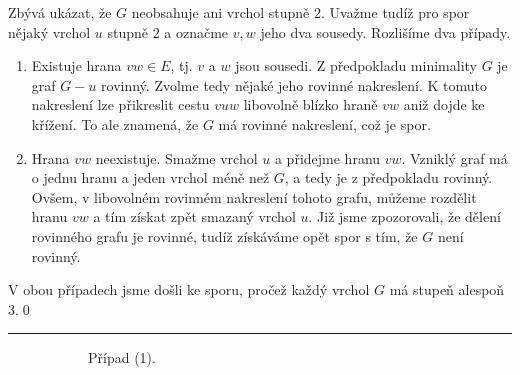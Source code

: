 \begin{enhproof}
 Zbývá ukázat, že $G$ neobsahuje ani vrchol stupně $2$. Uvažme tudíž pro spor
 nějaký vrchol $u$ stupně $2$ a označme $v,w$ jeho dva sousedy. Rozlišíme dva
 případy.
 \begin{enumerate}
  \item Existuje hrana $vw \in E$, tj. $v$ a $w$ jsou sousedi. Z předpokladu
   minimality $G$ je graf $G - u$ rovinný. Zvolme tedy nějaké jeho rovinné
   nakreslení. K tomuto nakreslení lze přikreslit cestu $vuw$ libovolně blízko
   hraně $vw$ aniž dojde ke křížení. To ale znamená, že $G$ má rovinné
   nakreslení, což je spor.
  \item Hrana $vw$ neexistuje. Smažme vrchol $u$ a přidejme hranu $vw$. Vzniklý
   graf má o jednu hranu a jeden vrchol méně než $G$, a tedy je z předpokladu
   rovinný. Ovšem, v libovolném rovinném nakreslení tohoto grafu, můžeme
   rozdělit hranu $vw$ a tím získat zpět smazaný vrchol $u$. Již jsme
   zpozorovali, že dělení rovinného grafu je rovinné, tudíž získáváme opět spor
   s tím, že $G$ není rovinný.
 \end{enumerate}
 V obou případech jsme došli ke sporu, pročež každý vrchol $G$ má stupeň alespoň
 $3$.\hfill\qed\\

 \hrule

 \begin{figure}[H]
  \centering
  \begin{subfigure}{.45\textwidth}
   \centering
   \caption{Případ (1).}
   \label{subfig:G-nema-stupen-2-pripad-1}
  \end{subfigure}
  \begin{subfigure}{.45\textwidth}
   \centering
\end{subfigure}
\end{figure}
\end{enhproof}
